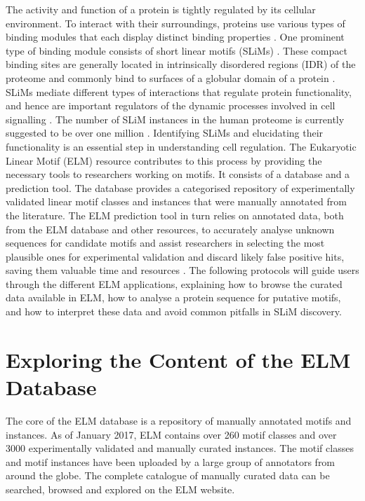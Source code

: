 \documentclass[12pt]{article}
\newcounter{proto}
\begin{document}
The activity and function of a protein is tightly regulated by its
cellular environment. To interact with their surroundings, proteins use
various types of binding modules that each display distinct binding
properties \citep{10550212}. One prominent type of binding module
consists of short linear motifs (SLiMs) \citep{18508681}. These compact
binding sites are generally located in intrinsically disordered regions
(IDR) of the proteome and commonly bind to
surfaces of a globular domain of a protein \citep{21909575}. SLiMs mediate
different types of interactions that regulate protein functionality, and hence
are important regulators of the dynamic processes involved in cell
signalling \citep{22480932} \citep{24926813}. The number of
SLiM instances in the human proteome is currently suggested to be over
one million \citep{25038412}. Identifying SLiMs and elucidating their
functionality is an essential step in understanding cell regulation. The
Eukaryotic Linear Motif (ELM) resource contributes to this process by
providing the necessary tools to researchers working on motifs. It
consists of a database and a prediction tool. The database provides a
categorised repository of experimentally validated linear motif classes
and instances that were manually annotated from the literature. The ELM
prediction tool in turn relies on annotated data, both from the ELM
database and other resources, to accurately analyse unknown sequences
for candidate motifs and assist researchers in selecting the most
plausible ones for experimental validation and discard likely false
positive hits, saving them valuable time and resources \citep{22110040}.
The following protocols will guide users through the different ELM
applications, explaining how to browse the curated data available in
ELM, how to analyse a protein sequence for putative motifs, and how to
interpret these data and avoid common pitfalls in SLiM discovery.


\section{Exploring the Content of the ELM Database}%
\label{sec:explore_content}%

The core of the ELM database is a repository of manually annotated motifs and
instances. As of January 2017, ELM contains over 260 motif classes and over
3000 experimentally validated and manually curated instances.
The motif classes and motif instances have been uploaded by a large group of
annotators from around the globe. The complete catalogue of manually curated
data can be searched, browsed and explored on the ELM website.
\end{document}
